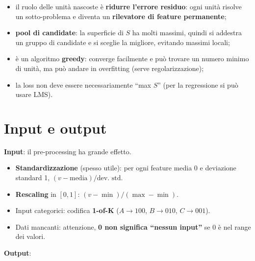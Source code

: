 \begin{itemize}
\tightlist
\item
  il ruolo delle unità nascoste è \textbf{ridurre l'errore residuo}:
  ogni unità risolve un sotto-problema e diventa un \textbf{rilevatore
  di feature permanente};
\item
  \textbf{pool di candidate}: la superficie di \(S\) ha molti massimi,
  quindi si addestra un gruppo di candidate e si sceglie la migliore,
  evitando massimi locali;
\item
  è un algoritmo \textbf{greedy}: converge facilmente e può trovare un
  numero minimo di unità, ma può andare in overfitting (serve
  regolarizzazione);
\item
  la loss non deve essere necessariamente ``max \(S\)'' (per la
  regressione si può usare LMS).
\end{itemize}

\section{Input e output}\label{input-e-output}

\textbf{Input}: il pre-processing ha grande effetto.

\begin{itemize}
\tightlist
\item
  \textbf{Standardizzazione} (spesso utile): per ogni feature media 0 e
  deviazione standard 1, \((v - \text{media})/\text{dev. std}\).
\item
  \textbf{Rescaling} in \([0,1]\): \((v - \min)/(\max - \min)\).
\item
  Input categorici: codifica \textbf{1-of-K} (\(A \to 100\),
  \(B \to 010\), \(C \to 001\)).
\item
  Dati mancanti: attenzione, \textbf{0 non significa ``nessun input''}
  se 0 è nel range dei valori.
\end{itemize}

\textbf{Output}:

